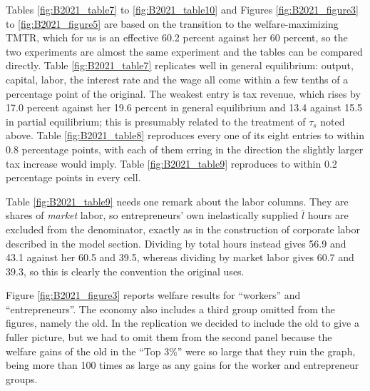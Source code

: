 \documentclass[11pt,fleqn]{article}
\begin{document}
Tables \ref{fig:B2021_table7} to \ref{fig:B2021_table10} and Figures \ref{fig:B2021_figure3} to \ref{fig:B2021_figure5} are based on the transition to the welfare-maximizing TMTR, which for us is an effective 60.2 percent against her 60 percent, so the two experiments are almost the same experiment and the tables can be compared directly. Table \ref{fig:B2021_table7} replicates well in general equilibrium: output, capital, labor, the interest rate and the wage all come within a few tenths of a percentage point of the original. The weakest entry is tax revenue, which rises by 17.0 percent against her 19.6 percent in general equilibrium and 13.4 against 15.5 in partial equilibrium; this is presumably related to the treatment of $\tau_s$ noted above. Table \ref{fig:B2021_table8} reproduces every one of its eight entries to within 0.8 percentage points, with each of them erring in the direction the slightly larger tax increase would imply. Table \ref{fig:B2021_table9} reproduces to within 0.2 percentage points in every cell.

Table \ref{fig:B2021_table9} needs one remark about the labor columns. They are shares of \textit{market} labor, so entrepreneurs' own inelastically supplied $\bar{l}$ hours are excluded from the denominator, exactly as in the construction of corporate labor described in the model section. Dividing by total hours instead gives 56.9 and 43.1 against her 60.5 and 39.5, whereas dividing by market labor gives 60.7 and 39.3, so this is clearly the convention the original uses.

Figure \ref{fig:B2021_figure3} reports welfare results for ``workers'' and ``entrepreneurs''. The economy also includes a third group omitted from the figures, namely the old. In the replication we decided to include the old to give a fuller picture, but we had to omit them from the second panel because the welfare gains of the old in the ``Top 3\%'' were so large that they ruin the graph, being more than 100 times as large as any gains for the worker and entrepreneur groups.
\end{document}
